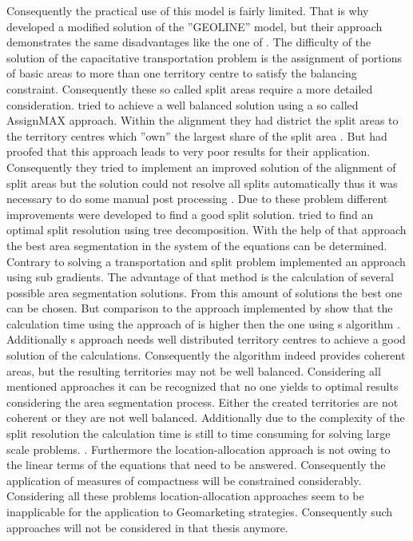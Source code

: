 Consequently the practical use of this model is fairly limited. That is why \citeauthor{fleischmann} \cite{fleischmann} developed a modified solution of the ''GEOLINE'' model, but their approach demonstrates the same disadvantages like the one of \citeauthor{hessstuart}. The difficulty of the solution of the capacitative transportation problem is the assignment of portions of basic areas to more than one territory centre to satisfy the balancing constraint. Consequently these so called split areas require a more detailed consideration. \citeauthor{hessstuart} \cite{hessstuart} tried to achieve a well balanced solution using a so called AssignMAX approach. Within the alignment they had district the split areas to the territory centres which ''own'' the largest share of the split area \cite{hessstuart, kalcsics}. But \citeauthor{fleischmann} \cite{fleischmann} had proofed that this approach leads to very poor results for their application. Consequently they tried to implement an improved solution of the alignment of split areas but the solution could not resolve all splits automatically thus it was necessary to do some manual post processing \cite{fleischmann, kalcsics}. Due to these problem different improvements were developed to find a good split solution. \citeauthor{schroeder} \cite{schroeder} tried to find an optimal split resolution using tree decomposition. With the help of that approach the best area segmentation in the system of the equations can be determined. Contrary to solving a transportation and split problem \citeauthor{zoltner} \cite{zoltner} implemented an approach using sub gradients. The advantage of that method is the calculation of several possible area segmentation solutions. From this amount of solutions the best one can be chosen. But comparison to the approach implemented by \citeauthor{schroeder} show that the calculation time using the approach of \citeauthor{zoltner} is higher then the one using \citeauthor{schroeder}s algorithm \cite{schroeder}. Additionally \citeauthor{zoltner}s approach needs well distributed territory centres to achieve a good solution of the calculations. Consequently the algorithm indeed provides coherent areas, but the resulting territories may not be well balanced. Considering all mentioned approaches it can be recognized that no one yields to optimal results considering the area segmentation process. Either the created territories are not coherent or they are not well balanced. Additionally due to the complexity of the split resolution the calculation time is still to time consuming for solving large scale problems. \cite{kalcsics}. Furthermore the location-allocation approach is not owing to the linear terms of the equations that need to be answered. Consequently the application of measures of compactness will be constrained considerably. Considering all these problems location-allocation approaches seem to be inapplicable for the application to Geomarketing strategies. Consequently such approaches will not be considered in that thesis anymore. \\
